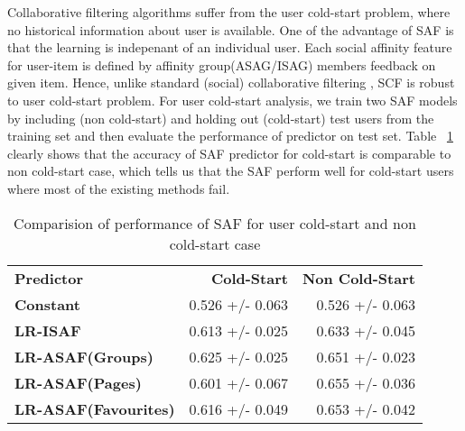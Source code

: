 Collaborative filtering algorithms suffer from the user cold-start problem,
where no historical information about user is available. One of the advantage of SAF is that 
the learning is indepenant of an individual user. Each social affinity feature for user-item is
defined by affinity group(ASAG/ISAG) members feedback on given item. 
Hence, unlike standard (social) collaborative filtering , SCF is robust to user 
cold-start problem.  For user cold-start analysis, we train two SAF models by 
including (non cold-start) and holding out (cold-start) test users from the 
training set and then evaluate the performance of predictor on test set. 
Table ~\ref{tab:coldstart} clearly shows that the accuracy of  SAF predictor for 
cold-start is comparable to non cold-start case, which tells us that the SAF
perform well for cold-start users where most of the existing methods fail.

\begin{table}[t!]
\centering
\begin{tabular}{|>{\small}l|>{\small}r|>{\small}r|}
\hline
& \multicolumn{2}{|c|}{\textbf{Accuracy}}\\
\hline
\textbf{Predictor}& \textbf{Cold-Start} & \textbf{Non Cold-Start}\\
\hline
\textbf{Constant} & 0.526  +/-  0.063 & 0.526  +/-  0.063 \\
\hline
\textbf{LR-ISAF} & 0.613 +/- 0.025 & 0.633  +/-  0.045 \\
\hline
\textbf{LR-ASAF(Groups)} & 0.625  +/-  0.025 & 0.651  +/-  0.023 \\
\hline
\textbf{LR-ASAF(Pages)} & 0.601  +/-  0.067 & 0.655  +/-  0.036 \\
\hline
\textbf{LR-ASAF(Favourites)} & 0.616  +/-  0.049 & 0.653  +/-  0.042\\
\hline
\end{tabular}
\caption{Comparision of performance of SAF for user cold-start and non cold-start case}
\label{tab:coldstart}
\end{table}